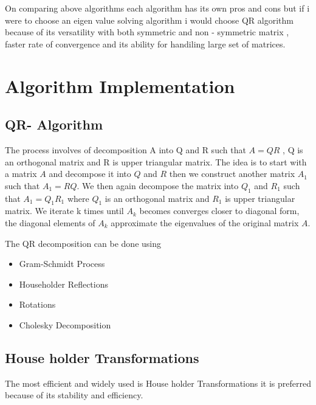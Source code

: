 \documentclass[pdflatex,sn-mathphys-num]{sn-jnl}
\begin{document}
On comparing above algorithms each algorithm has its own pros and cons but if i were to choose an eigen value solving algorithm i would choose QR algorithm because of its versatility with both symmetric and non - symmetric matrix , faster rate of convergence and its ability for handiling large set of matrices.

\section*{Algorithm Implementation}
\subsection*{QR- Algorithm}
The process involves of decomposition A into Q and R such that $A=QR$ , Q is an orthogonal matrix and R is upper triangular matrix. The idea is to start with a matrix $A$ and decompose it into $Q$ and $R$ then we construct another matrix $A_1$ such that $A_1 = RQ$. We then again decompose the matrix into $Q_1$ and $R_1$ such that $A_1=Q_1R_1$ where  $Q_1$ is an orthogonal matrix and $R_1$ is upper triangular matrix. We iterate k times until $A_k$ becomes converges closer to diagonal form, the diagonal elements of $A_k$ approximate the eigenvalues of the original matrix $A$.

    The QR decomposition can be done using  
     \begin{itemize}
\item Gram-Schmidt Process
\item  Householder Reflections
\item  Rotations
\item  Cholesky Decomposition
\end{itemize}


\subsection*{House holder Transformations }
 The most efficient and widely used is House holder Transformations it is preferred because of its stability and efficiency.
\end{document}
